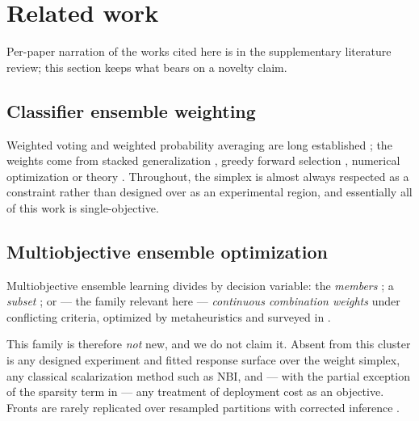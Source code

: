 \section{Related work}
\label{sec:related}

Per-paper narration of the works cited here is in the supplementary literature review; this section keeps what bears
on a novelty claim.

\subsection{Classifier ensemble weighting}
\label{sec:rel:weighting}

Weighted voting and weighted probability averaging are long established
\citep{hansen1990neural,kittler1998combining,dietterich2000ensemble,kuncheva2014combining}; the weights come from
stacked generalization
\citep{wolpert1992stacked,breiman1996stacked,leblanc1996combining,vanderlaan2007super,ledell2016auc}, greedy forward
selection \citep{caruana2004ensemble}, numerical optimization
\citep{zhang2011sparse,yao2018stacking,shahhosseini2022optimizing,hassan2026weighted,xu2026pseo} or theory
\citep{fumera2005theoretical}. Throughout, the simplex is almost always respected as a constraint rather than designed
over as an experimental region, and essentially all of this work is single-objective.

\subsection{Multiobjective ensemble optimization}
\label{sec:rel:moo}

Multiobjective ensemble learning divides by decision variable: the \emph{members}
\citep{abbass2003pareto,chandra2006ensemble,jin2008pareto}; a \emph{subset}
\citep{dossantos2008dynamic,qian2015pareto}; or --- the family relevant here --- \emph{continuous combination
weights} under conflicting criteria, optimized by metaheuristics
\citep{ekbal2011multiobjective,ekbal2013combining,bandyopadhyay2008amosa,onan2016multiobjective,rezaei2019multi,zhao2018multiobjective,vrugt2006multi,galvan2026simultaneous}
and surveyed in \citet{ribeiro2020ensemble}.

This family is therefore \emph{not} new, and we do not claim it. Absent from this cluster is any designed experiment
and fitted response surface over the weight simplex, any classical scalarization method such as NBI, and --- with the
partial exception of the sparsity term in \citet{zhao2018multiobjective} --- any treatment of deployment cost as an
objective. Fronts are rarely replicated over resampled partitions with corrected inference
\citep{demsar2006statistical}.

